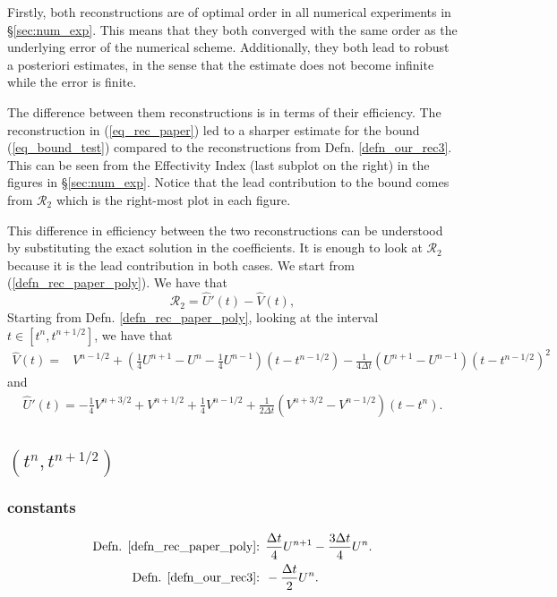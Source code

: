 \documentclass[12pt,a4paper]{article}
\numberwithin{equation}{section}
\theoremstyle{definition}
\newcommand{\qp}[1]{\left(#1\right)}
\newcommand{\qb}[1]{\left[#1\right]}
\newcommand{\rec}[1]{\widehat{{#1}}}
\begin{document}
Firstly,  both reconstructions are of optimal order in all numerical experiments in \S \ref{sec:num_exp}. This means that they both converged with the same order as the underlying error of the numerical scheme.  
Additionally, they both lead to robust a posteriori estimates, in the sense that the estimate does not become infinite while the error is finite.

The difference between them reconstructions is in terms of their efficiency.  The reconstruction in (\ref{eq_rec_paper}) led to a sharper estimate for the bound (\ref{eq_bound_test}) compared to the reconstructions from Defn.  \ref{defn_our_rec3}.  This can be seen from the Effectivity Index (last subplot on the right) in the figures in \S\ref{sec:num_exp}.  Notice that the lead contribution to the bound comes from $\mathcal{R}_2$ which is the right-most plot in each figure.

This difference in efficiency between the two reconstructions can be understood by substituting the exact solution in the coefficients.  It is enough to look at $\mathcal{R}_2$ because it is the lead contribution in both cases.  We start  from (\ref{defn_rec_paper_poly}).  We have that 
\begin{equation}
\mathcal{R}_2 = \rec{U}'\qp{t}- \rec{V}\qp{t},
\end{equation}
Starting from Defn. \ref{defn_rec_paper_poly}, looking at the interval $t\in\qb{t^{n}, t^{n+1/2}}$, we have that
\begin{equation*}
\begin{aligned}
\rec{V}\qp{t}=	& V^{n-1/2}
+\qp{\frac{1}{4}U^{n+1}-U^n-\frac{1}{4}U^{n-1}}\qp{t-t^{n-1/2}}
-\frac{1}{4\Delta t}\qp{U^{n+1}-U^{n-1}}\qp{t-t^{n-1/2}}^2
\end{aligned}
\end{equation*}
and 
\begin{equation*}
\begin{aligned}
\rec{U}'\qp{t}=	-\frac{1}{4}V^{n+3/2}+V^{n+1/2}+\frac{1}{4}V^{n-1/2}
+\frac{1}{2\Delta t}\qp{V^{n+3/2}-V^{n-1/2}}\qp{t-t^{n}}.
\end{aligned}
\end{equation*}
\subsection{$\qp{t^n, t^{n+1/2}}$}
\subsubsection{constants}
\begin{equation*}
\begin{aligned}
\text{Defn. \ref{defn_rec_paper_poly}: }&\frac{\Delta t}{4}U^{n+1}-\frac{3\Delta t}{4}U^n. \\
\text{Defn. \ref{defn_our_rec3}: }&-\frac{\Delta t}{2}U^{n}.
\end{aligned}
\end{equation*}
\end{document}
